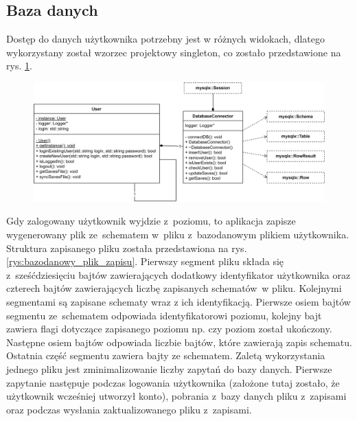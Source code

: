 \documentclass[12pt, a4paper]{article} %
\begin{document}




\subsection{Baza danych}
\aka Dostęp do danych użytkownika potrzebny jest w różnych widokach, dlatego wykorzystany został wzorzec projektowy singleton, co zostało przedstawione na rys. \ref{rys:diagram_klas_baza_danych}. 

\begin{figure}[h]
	\centering
	\includegraphics[width=15cm]{images/diagramy_klas/plan-diagram_klas_baza_danych.png}
	\caption{}
	\label{rys:diagram_klas_baza_danych}
\end{figure} 

\aka Gdy zalogowany użytkownik wyjdzie z~poziomu, to aplikacja zapisze wygenerowany plik ze~schematem w~pliku z~bazodanowym plikiem użytkownika. Struktura zapisanego pliku została przedstawiona na rys. \ref{rys:bazodanowy_plik_zapisu}. Pierwszy segment pliku składa się z~sześćdziesięciu bajtów zawierających dodatkowy identyfikator użytkownika oraz czterech bajtów zawierających liczbę zapisanych schematów~w pliku. Kolejnymi segmentami są zapisane schematy wraz z ich identyfikacją. Pierwsze osiem bajtów segmentu ze~schematem odpowiada identyfikatorowi poziomu, kolejny bajt zawiera flagi dotyczące zapisanego poziomu np. czy poziom został ukończony. Następne osiem bajtów odpowiada liczbie bajtów, które zawierają zapis schematu. Ostatnia część segmentu zawiera bajty ze schematem. Zaletą wykorzystania jednego pliku jest zminimalizowanie liczby zapytań do bazy danych. Pierwsze zapytanie następuje podczas logowania użytkownika (założone tutaj zostało, że użytkownik wcześniej utworzył konto), pobrania z~bazy danych pliku z~zapisami oraz podczas wysłania zaktualizowanego pliku z~zapisami.
\end{document}
